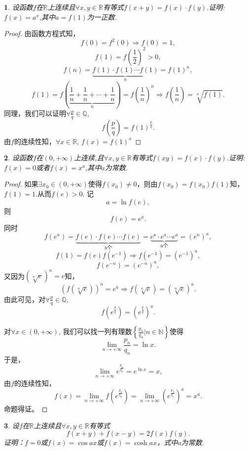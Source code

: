 \documentclass[utf8]{book}
\newtheorem{example}{}[section]             %
\begin{document}
\begin{example}
设函数$f$在$\mathbb{R}$上连续且$\forall x, y\in\mathbb{R}$有等式$f(x+y)=f(x)\cdot f(y)$.证明:$f(x)=a^x$,其中$a=f(1)$为一正数.
\end{example}
\begin{proof}
由函数方程式知，
$$f(0) = f^2(0)\Rightarrow f(0) = 1,$$
$$f(1) = f\left(\frac{1}{2}\right)^2 > 0,$$
$$f(n) = \underbrace{f(1)\cdot f(1)\cdots f(1)}_{n}=f(1)^n,$$
$$f(1) = f\left(\underbrace{\frac{1}{n}+\frac{1}{n}+\cdots+\frac{1}{n}}_{n}\right)=f\left(\frac{1}{n}\right)^n\Rightarrow f\left(\frac{1}{n}\right)=\sqrt[n]{f(1)}.$$
同理，我们可以证明$\forall \frac{p}{q}\in\mathbb{Q}$, 
$$f\left(\frac{p}{q}\right)=f(1)^{\frac{p}{q}}.$$
由$f$的连续性知，$\forall x\in\mathbb{R}$, $f(x) = f(1)^x$
\end{proof}
\begin{example}
设函数$f$在$(0, +\infty)$上连续,且$\forall x, y\in\mathbb{R}$有等式$f(xy)=f(x)\cdot f(y)$.证明:$f(x)=0$或者$f(x)=x^a$,其中$a$为常数.
\end{example}
\begin{proof}如果$\exists x_0 \in (0, +\infty)$使得$f(x_0)\neq 0$，则由$f(x_0) =f(x_0)f(1)$知，$f(1) = 1$.从而$f(e) > 0$. 记
$$a=\ln{f(e)},$$ 则$$f(e) = e^a.$$
同时
$$f(e^n)=\underbrace{f(e)\cdot f(e)\cdots f(e)}_{\text{n个}}=\underbrace{e^a\cdot e^a\cdots e^a}_{\text{n个}}=(e^n)^a,$$
$$f(1)=f(e)f(e^{-1})\Rightarrow f(e^{-1}) = (e^{-1})^a,$$
$$f(e^{-n}) = (e^{-n})^a,$$
又因为$(\sqrt[n]{e})^n = e$知，
$$\left(f(\sqrt[n]{e})\right)^n = e^a\Rightarrow f(\sqrt[n]{e})=(\sqrt[n]{e})^a.$$
由此可见，对$\forall \frac{p}{q}\in\mathbb{Q}$, 
$$f(e^{\frac{p}{q}})=\left(e^{\frac{p}{q}}\right)^a.$$

对$\forall x\in(0,+\infty)$, 我们可以找一列有理数$\left\{\frac{p_n}{q_n}\bigg| n\in\mathbb{N}\right\}$使得
$$\displaystyle\lim_{n\to +\infty}\frac{p_n}{q_n}=\ln{x}.$$
于是，
$$\displaystyle\lim_{n\to +\infty}e^{\frac{p_n}{q_n}}=e^{\ln{x}} = x,$$
由$f$的连续性知，
$$f(x)=\displaystyle\lim_{n\to +\infty}f\left(e^{\frac{p_n}{q_n}}\right)=\displaystyle\lim_{n\to +\infty}\left(e^{\frac{p_n}{q_n}}\right)^a=x^a.$$
命题得证。
\end{proof}
\begin{example}
设$f$在$\mathbb{R}$上连续且$\forall x, y\in\mathbb{R}$有等式
$$f(x+y)+f(x-y)=2f(x)f(y).$$证明：$f=0$或$f(x)=\cos{ax}$或$f(x)=\cosh{ax}$，式中$a$为常数.
\end{example}
\end{document}
